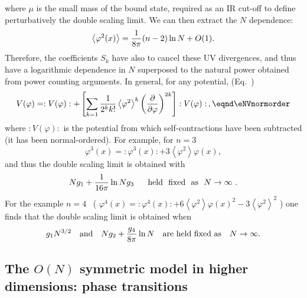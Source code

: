 where $\mu$ is the small mass of the bound state, required as an IR cut-off to
define perturbatively the double scaling limit.
We can then extract the $N$ dependence:
$$\left<\varphi^2(x)\right>={1\over8\pi}(n-2)\ln N+O(1) .$$
Therefore, the coefficients $S_k$ have also to cancel these UV divergences,
and thus have a logarithmic dependence in $N$ superposed to the natural
power obtained from power counting arguments. In general, for any potential,
(Eq.~\eqns{\enormorderInv})
$$V(\varphi)=:V(\varphi):+\left[\sum_{k=1}{1\over2^k
k!}\left<\varphi^2\right>^k \left(\partial\over\partial \varphi\right)^{2k}
\right]:V(\varphi):\,, \eqnd\eNVnormorder $$
where $:V(\varphi):$ is the potential from which self-contractions have been
subtracted (it has been normal-ordered). For example, for $n=3$
$$\varphi^3(x)=:\varphi^3(x):+3\left<\varphi^2\right> \varphi(x) ,$$
and thus the double scaling limit is obtained with
$$N g_1+{1\over16\pi}\ln N g_3  \ \ \ \ \ {\rm held \ \ fixed \ \ as}
\ \ N \to \infty \ .$$ For the example $n=4$ ~(
$\varphi^4(x)=:\varphi^4(x):+6\left<\varphi^2\right>
\varphi(x)^2-3\left<\varphi^2\right>^2$ ) one finds that the
double scaling limit is obtained when
$$ g_1 N^{3/2}\quad {\rm and}\quad N g_2
+{g_4\over8\pi}\ln N \ \ \ {\rm are  \ held \  fixed  \ as}\ \ \
N\to \infty .$$
%
\subsection{The $O(N)$ symmetric model in higher dimensions: phase transitions}

